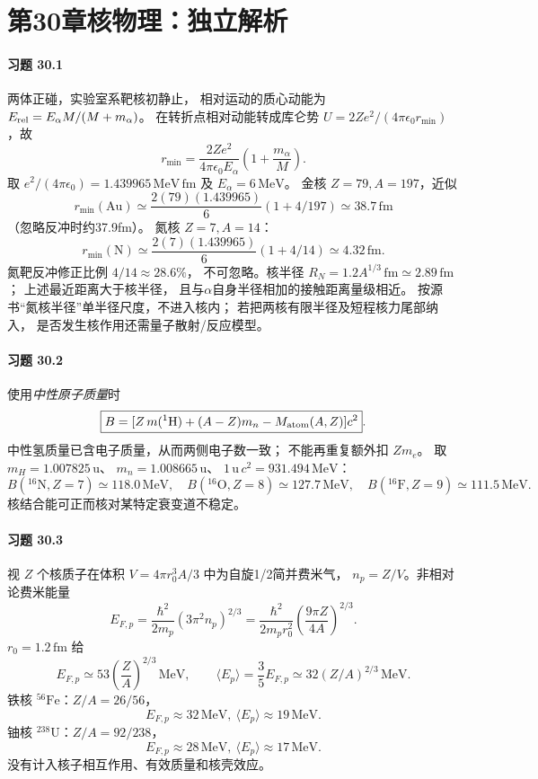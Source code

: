 \section*{第30章\quad 核物理：独立解析}
\paragraph{习题 30.1}
两体正碰，实验室系靶核初静止，
相对运动的质心动能为
\(E_{\rm rel}=E_{\alpha}M/(M+m_\alpha)\)。
在转折点相对动能转成库仑势
\(U=2Z e^2/(4\pi\epsilon_0r_{\min})\)，故
\[
\boxed{r_{\min}=\frac{2Ze^2}{4\pi\epsilon_0E_\alpha}
\left(1+\frac{m_\alpha}{M}\right)}.
\]
取 \(e^2/(4\pi\epsilon_0)=1.439965\,\mathrm{MeV\,fm}\)
及 \(E_\alpha=6\,\mathrm{MeV}\)。
金核 \(Z=79,A=197\)，近似
\[
\boxed{r_{\min}(\mathrm{Au})\simeq
\frac{2(79)(1.439965)}6(1+4/197)
\simeq38.7\,\mathrm{fm}}
\]
（忽略反冲时约37.9fm）。
氮核 \(Z=7,A=14\)：
\[
\boxed{r_{\min}(\mathrm N)\simeq
\frac{2(7)(1.439965)}6(1+4/14)
\simeq4.32\,\mathrm{fm}}.
\]
氮靶反冲修正比例 \(4/14\approx28.6\%\)，
不可忽略。核半径 \(R_N=1.2A^{1/3}\,\mathrm{fm}
\simeq2.89\,\mathrm{fm}\)；
上述最近距离大于核半径，
且与\(\alpha\)自身半径相加的接触距离量级相近。
按源书“氮核半径”单半径尺度，不进入核内；
若把两核有限半径及短程核力尾部纳入，
是否发生核作用还需量子散射/反应模型。

\paragraph{习题 30.2}
使用\emph{中性原子质量}时
\[
\boxed{B=[Z\,m({}^{1}\mathrm H)
+(A-Z)m_n-M_{\rm atom}(A,Z)]c^2}.
\]
中性氢质量已含电子质量，从而两侧电子数一致；
不能再重复额外扣 \(Zm_e\)。
取 \(m_H=1.007825\,\mathrm u\)、
\(m_n=1.008665\,\mathrm u\)、
\(1\,\mathrm u\,c^2=931.494\,\mathrm{MeV}\)：
\[
\boxed{B({}^{16}\mathrm N,Z=7)\simeq118.0\,\mathrm{MeV}},
\quad\boxed{B({}^{16}\mathrm O,Z=8)\simeq127.7\,\mathrm{MeV}},
\quad\boxed{B({}^{16}\mathrm F,Z=9)\simeq111.5\,\mathrm{MeV}}.
\]
核结合能可正而核对某特定衰变道不稳定。

\paragraph{习题 30.3}
视 \(Z\) 个核质子在体积
\(V=4\pi r_0^3A/3\) 中为自旋1/2简并费米气，
\(n_p=Z/V\)。非相对论费米能量
\[
E_{F,p}=\frac{\hbar^2}{2m_p}(3\pi^2n_p)^{2/3}
=\frac{\hbar^2}{2m_pr_0^2}
\left(\frac{9\pi Z}{4A}\right)^{2/3}.
\]
\(r_0=1.2\,\mathrm{fm}\) 给
\[
\boxed{E_{F,p}\simeq53\left(\frac ZA\right)^{2/3}
\,\mathrm{MeV}},\qquad
\boxed{\langle E_p\rangle=\frac35E_{F,p}
\simeq32(Z/A)^{2/3}\,\mathrm{MeV}}.
\]
铁核 \({}^{56}\mathrm{Fe}\)：\(Z/A=26/56\)，
\[
\boxed{E_{F,p}\approx32\,\mathrm{MeV},\
\langle E_p\rangle\approx19\,\mathrm{MeV}}.
\]
铀核 \({}^{238}\mathrm U\)：\(Z/A=92/238\)，
\[
\boxed{E_{F,p}\approx28\,\mathrm{MeV},\
\langle E_p\rangle\approx17\,\mathrm{MeV}}.
\]
没有计入核子相互作用、有效质量和核壳效应。

